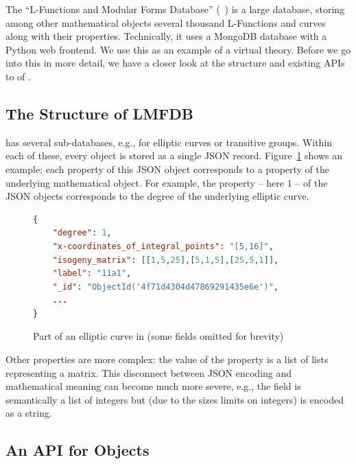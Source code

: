 The ``L-Functions and Modular Forms Database'' (\lmfdb~\cite{lmfdb}) is a large database, storing among other mathematical objects several thousand L-Functions and curves along with their properties. 
Technically, it uses a MongoDB database with a Python web frontend. 
We use this as an example of a virtual theory. 
Before we go into this in more detail, we have a closer look at the structure and existing APIs to of \lmfdb.

\subsection{The Structure of LMFDB}\label{sec:sota:struct}

\lmfdb has several sub-databases, e.g., for elliptic curves or transitive groups. 
Within each of these, every object is stored as a single JSON record.
Figure~\ref{fig:lmfdbexample} shows an example: each property of this JSON object corresponds to a property of the underlying mathematical object. 
For example, the  property -- here $1$ -- of the JSON objects corresponds to the degree of the underlying elliptic curve. 

\begin{figure}[ht]\centering
\begin{lstlisting}[language=json]
{
    "degree": 1,
    "x-coordinates_of_integral_points": "[5,16]",
    "isogeny_matrix": [[1,5,25],[5,1,5],[25,5,1]],
    "label": "11a1",
    "_id": "ObjectId('4f71d4304d47869291435e6e')",
    ...
}
\end{lstlisting}\vspace*{-1.5em}
  \caption[An elliptic curve from \lmfdb]{
    Part of an elliptic curve in \lmfdb (some fields omitted for brevity)
  }
  \label{fig:lmfdbexample}
\end{figure}

Other properties are more complex: the value of the  property is a list of lists representing a matrix. 
This disconnect between JSON encoding and mathematical meaning can become much more severe, e.g., the  field is semantically a list of integers but (due to the sizes limits on integers) is encoded as a string.

\subsection{An API for \lmfdb Objects}\label{sec:sota:api}

